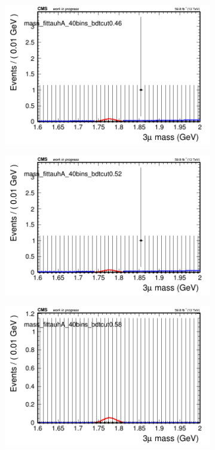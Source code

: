 \begin{figure}[H]
\begin{subfigure}{0.2\textwidth}
        \includegraphics[width=\textwidth]{unfixed_exp/plots/tauhA/massfit_tauhA_40bins_bdtcut0.46.png}
        \caption{}
    \end{subfigure}
    \begin{subfigure}{0.2\textwidth}
        \includegraphics[width=\textwidth]{unfixed_exp/plots/tauhA/massfit_tauhA_40bins_bdtcut0.52.png}
        \caption{}
    \end{subfigure}
    \begin{subfigure}{0.2\textwidth}
        \includegraphics[width=\textwidth]{unfixed_exp/plots/tauhA/massfit_tauhA_40bins_bdtcut0.58.png}

\end{subfigure}
\end{figure}

